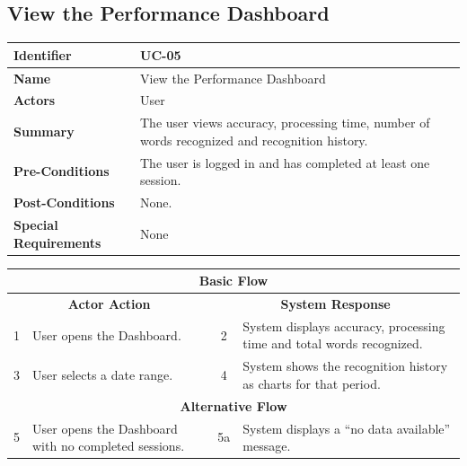 \documentclass{FastFyp}
\begin{document}
\subsection{View the Performance Dashboard}
\begin{table}[H]
\centering
\renewcommand{\arraystretch}{1.3}
\begin{tabularx}{\textwidth}{|l|X|}
\hline
\textbf{Identifier} & UC-05 \\ \hline
\textbf{Name} & View the Performance Dashboard \\ \hline
\textbf{Actors} & User \\ \hline
\textbf{Summary} & The user views accuracy, processing time, number of words recognized and recognition history. \\ \hline
\textbf{Pre-Conditions} & The user is logged in and has completed at least one session. \\ \hline
\textbf{Post-Conditions} & None. \\ \hline
\textbf{Special Requirements} & None \\ \hline
\end{tabularx}

\vspace{-\arrayrulewidth}
\begin{tabularx}{\textwidth}{|c|X|c|X|}
\hline
\multicolumn{4}{|c|}{\textbf{Basic Flow}} \\ \hline
\multicolumn{2}{|c|}{\textbf{Actor Action}} & \multicolumn{2}{c|}{\textbf{System Response}} \\ \hline
1 & User opens the Dashboard. & 2 & System displays accuracy, processing time and total words recognized. \\ \hline
3 & User selects a date range. & 4 & System shows the recognition history as charts for that period. \\ \hline
\multicolumn{4}{|c|}{\textbf{Alternative Flow}} \\ \hline
5 & User opens the Dashboard with no completed sessions. & 5a & System displays a ``no data available'' message. \\ \hline
\end{tabularx}
\end{table}
\end{document}
